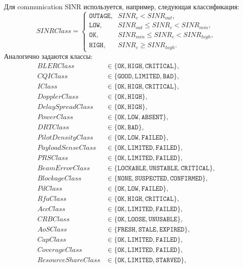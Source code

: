 \documentclass[10pt,a4paper]{article}
\newcommand{\code}[1]{\texttt{#1}}
\begin{document}
Для communication SINR используется, например, следующая классификация:
\begin{equation}
SINRClass=\begin{cases}
\code{OUTAGE},& SINR_c<SINR_{out},\\
\code{LOW},& SINR_{out}\le SINR_c<SINR_{min},\\
\code{OK},& SINR_{min}\le SINR_c<SINR_{high},\\
\code{HIGH},& SINR_c\ge SINR_{high}.
\end{cases}
\end{equation}
Аналогично задаются классы:
\begin{align}
BLERClass&\in\{\code{OK},\code{HIGH},\code{CRITICAL}\},\\
CQIClass&\in\{\code{GOOD},\code{LIMITED},\code{BAD}\},\\
IClass&\in\{\code{OK},\code{HIGH},\code{CRITICAL}\},\\
DopplerClass&\in\{\code{OK},\code{HIGH}\},\\
DelaySpreadClass&\in\{\code{OK},\code{HIGH}\},\\
PowerClass&\in\{\code{OK},\code{LOW},\code{ABSENT}\},\\
DRTClass&\in\{\code{OK},\code{BAD}\},\\
PilotDensityClass&\in\{\code{OK},\code{LOW},\code{FAILED}\},\\
PayloadSenseClass&\in\{\code{OK},\code{LIMITED},\code{FAILED}\},\\
PRSClass&\in\{\code{OK},\code{LIMITED},\code{FAILED}\},\\
BeamErrorClass&\in\{\code{LOCKABLE},\code{UNSTABLE},\code{CRITICAL}\},\\
BlockageClass&\in\{\code{NONE},\code{SUSPECTED},\code{CONFIRMED}\},\\
PdClass&\in\{\code{OK},\code{LOW},\code{FAILED}\},\\
RfaClass&\in\{\code{OK},\code{HIGH},\code{CRITICAL}\},\\
AccClass&\in\{\code{OK},\code{LIMITED},\code{FAILED}\},\\
CRBClass&\in\{\code{OK},\code{LOOSE},\code{UNUSABLE}\},\\
AoSClass&\in\{\code{FRESH},\code{STALE},\code{EXPIRED}\},\\
CapClass&\in\{\code{OK},\code{LIMITED},\code{FAILED}\},\\
CoverageClass&\in\{\code{OK},\code{LIMITED},\code{FAILED}\},\\
ResourceShareClass&\in\{\code{OK},\code{LIMITED},\code{STARVED}\},\\

\end{align}
\end{document}

